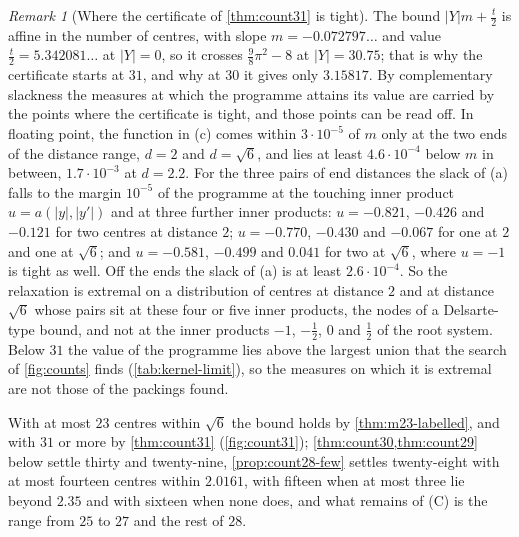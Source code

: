 \documentclass[11pt,reqno]{amsart}
\renewcommand{\_}{\origunderscore\allowbreak}
\numberwithin{equation}{section}
\theoremstyle{plain}
\theoremstyle{definition}
\theoremstyle{remark}
\newtheorem{remark}[thm]{Remark}
\begin{document}
\begin{remark}[Where the certificate of \cref{thm:count31} is tight]\label{rem:count31-tight}
The bound $|Y|m+\frac t2$ is affine in the number of centres, with slope
$m=-0.072797\ldots$ and value $\frac t2=5.342081\ldots$ at $|Y|=0$, so it
crosses $\frac98\pi^2-8$ at $|Y|=30.75$; that is why the certificate
starts at $31$, and why at $30$ it gives only $3.15817$. By complementary
slackness the measures at which the programme attains its value are carried
by the points where the certificate is tight, and those points can be read
off. In floating point, the function in (c) comes within $3\cdot10^{-5}$ of
$m$ only at the two ends of the distance range, $d=2$ and $d=\sqrt6$, and
lies at least $4.6\cdot10^{-4}$ below $m$ in between, $1.7\cdot10^{-3}$ at
$d=2.2$. For the three pairs of end distances the slack of (a) falls to the
margin $10^{-5}$ of the programme at the touching inner product
$u=a(|y|,|y'|)$ and at three further inner products: $u=-0.821$, $-0.426$
and $-0.121$ for two centres at distance $2$; $u=-0.770$, $-0.430$ and
$-0.067$ for one at $2$ and one at $\sqrt6$; and $u=-0.581$, $-0.499$ and
$0.041$ for two at $\sqrt6$, where $u=-1$ is tight as well. Off the ends
the slack of (a) is at least $2.6\cdot10^{-4}$. So the relaxation is
extremal on a distribution of centres at distance $2$ and at distance
$\sqrt6$ whose pairs sit at these four or five inner products, the nodes of
a Delsarte-type bound, and not at the inner products $-1$, $-\frac12$, $0$
and $\frac12$ of the root system. Below $31$ the value of the programme
lies above the largest union that the search of \cref{fig:counts} finds
(\cref{tab:kernel-limit}), so the measures on which it is extremal are not
those of the packings found.
\end{remark}

With at most $23$ centres within $\sqrt6$ the bound holds by
\cref{thm:m23-labelled}, and with $31$ or more by \cref{thm:count31}
(\cref{fig:count31}); \cref{thm:count30,thm:count29} below settle thirty and
twenty-nine, \cref{prop:count28-few} settles twenty-eight with at most
fourteen centres within $2.0161$, with fifteen when at most three lie beyond
$2.35$ and with sixteen when none does, and what remains of (C) is the range from $25$ to
$27$ and the rest of $28$.
\end{document}
